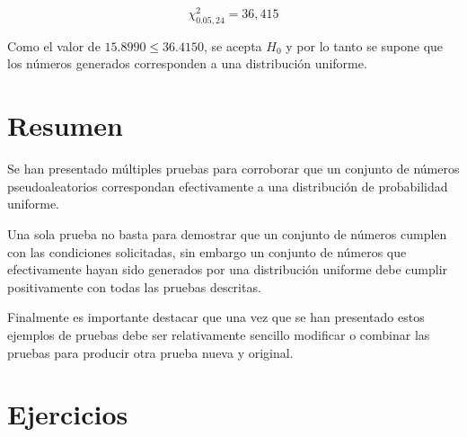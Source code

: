 $$\chi^2_{0.05,24} = 36,415$$


Como el valor de $15.8990 \leq 36.4150$, se acepta $H_0$ y por lo tanto se supone que los números generados corresponden a una distribución uniforme.

\section{Resumen}

Se han presentado múltiples pruebas para corroborar que un conjunto de números pseudoaleatorios correspondan efectivamente a una distribución de probabilidad uniforme.

Una sola prueba no basta para demostrar que un conjunto de números cumplen con las condiciones solicitadas, sin embargo un conjunto de números que efectivamente hayan sido generados por una distribución uniforme debe cumplir positivamente con todas las pruebas descritas.

Finalmente es importante destacar que una vez que se han presentado estos ejemplos de pruebas debe ser relativamente sencillo modificar o combinar las pruebas para producir otra prueba nueva y original.



\section{Ejercicios}

